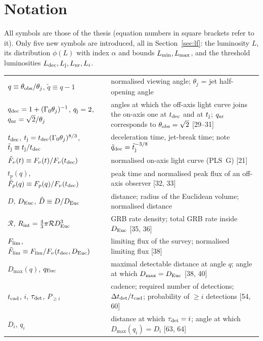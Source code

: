 \documentclass[11pt,a4paper]{article}
\newcommand{\tq}{\tilde{q}}
\newcommand{\tD}{\tilde{D}}
\newcommand{\tF}{\tilde{F}}
\newcommand{\ttj}{\tilde{t}_{\rm j}}
\newcommand{\Euc}{{\rm Euc}}
\newcommand{\dec}{{\rm dec}}
\newcommand{\nr}{{\rm nr}}
\newcommand{\Flim}{F_{\rm lim}}
\newcommand{\tFlim}{\tilde{F}_{\rm lim}}
\newcommand{\Rint}{R_{\rm int}}
\newcommand{\tcad}{t_{\rm cad}}
\newcommand{\tdec}{t_{\rm dec}}
\newcommand{\tj}{t_{\rm j}}
\newcommand{\Lmin}{L_{\rm min}}
\newcommand{\Lmax}{L_{\rm max}}
\newcommand{\Ldec}{L_{\rm dec}}
\newcommand{\Lj}{L_{\rm j}}
\newcommand{\Lnr}{L_{\rm nr}}
\begin{document}
\section*{Notation}

All symbols are those of the thesis (equation numbers in square brackets refer to it). Only five new symbols are introduced, all in Section~\ref{sec:lf}: the luminosity $L$, its distribution $\phi(L)$ with index $\alpha$ and bounds $\Lmin,\Lmax$, and the threshold luminosities $\Ldec,\Lj,\Lnr,L_i$.

\begin{center}\footnotesize
\renewcommand{\arraystretch}{1.2}
\begin{tabular}{@{}l p{8.3cm}@{}}
\toprule
$q\equiv\theta_{\rm obs}/\theta_j$,\; $\tq\equiv q-1$ & normalised viewing angle; $\theta_j$ = jet half-opening angle \\
$q_\dec = 1+(\Gamma_0\theta_j)^{-1}$,\; $q_{\rm j}=2$,\; $q_\nr=\sqrt2/\theta_j$ & angles at which the off-axis light curve joins the on-axis one at $\tdec$ and at $\tj$; $q_\nr$ corresponds to $\theta_{\rm obs}=\sqrt2$ [29--31]\\
$\tdec$,\; $\tj=\tdec(\Gamma_0\theta_j)^{8/3}$,\; $\ttj\equiv\tj/\tdec$ & deceleration time, jet-break time; note $\tq_\dec=\ttj^{-3/8}$ \\
$\tF_\nu(t)\equiv F_\nu(t)/F_\nu(\tdec)$ & normalised on-axis light curve (PLS~G) [21] \\
$t_p(q)$,\; $\tF_p(q)\equiv F_p(q)/F_\nu(\tdec)$ & peak time and normalised peak flux of an off-axis observer [32, 33] \\
$D$,\; $D_\Euc$,\; $\tD\equiv D/D_\Euc$ & distance; radius of the Euclidean volume; normalised distance \\
$\mathcal R$,\; $\Rint=\tfrac43\pi\mathcal R D_\Euc^3$ & GRB rate density; total GRB rate inside $D_\Euc$ [35, 36] \\
$\Flim$,\; $\tFlim\equiv\Flim/F_\nu(\tdec,D_\Euc)$ & limiting flux of the survey; normalised limiting flux [38] \\
$D_{\max}(q)$,\; $q_\Euc$ & maximal detectable distance at angle $q$; angle at which $D_{\max}=D_\Euc$ [38, 40] \\
$\tcad$,\; $i$,\; $\tau_{\rm det}$,\; $P_{\geq i}$ & cadence; required number of detections; $\Delta t_{\rm det}/\tcad$; probability of $\geq i$ detections [54, 60] \\
$D_i$,\; $q_i$ & distance at which $\tau_{\rm det}=i$; angle at which $D_{\max}(q_i)=D_i$ [63, 64] \\

\end{tabular}
\end{center}
\end{document}
